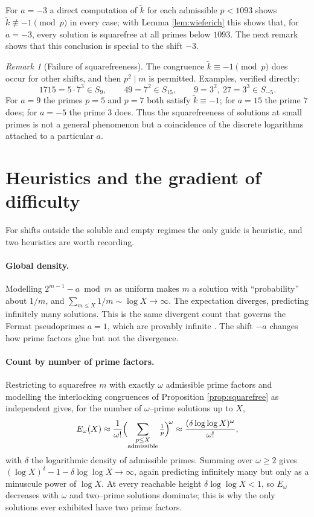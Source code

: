 \documentclass[11pt,reqno]{amsart}
\theoremstyle{plain}
\theoremstyle{definition}
\theoremstyle{remark}
\newtheorem{remark}{Remark}
\newcommand{\dvd}{\mid}
\begin{document}
For $a=-3$ a direct computation of $\widetilde k$ for each admissible $p<1093$ shows $\widetilde k\not\equiv-1\pmod p$ in every case; with Lemma \ref{lem:wieferich} this shows that, for $a=-3$, every solution is squarefree at all primes below $1093$. The next remark shows that this conclusion is special to the shift $-3$.

\begin{remark}[Failure of squarefreeness]\label{rem:sqfree-fail}
The congruence $\widetilde k\equiv-1\pmod p$ does occur for other shifts, and then $p^{2}\dvd m$ is permitted. Examples, verified directly:
\[
1715=5\cdot7^{3}\in S_{9},\qquad 49=7^{2}\in S_{15},\qquad 9=3^{2},\ 27=3^{3}\in S_{-5}.
\]
For $a=9$ the primes $p=5$ and $p=7$ both satisfy $\widetilde k\equiv-1$; for $a=15$ the prime $7$ does; for $a=-5$ the prime $3$ does. Thus the squarefreeness of solutions at small primes is not a general phenomenon but a coincidence of the discrete logarithms attached to a particular $a$.
\end{remark}

\section{Heuristics and the gradient of difficulty}\label{sec:heuristics}

For shifts outside the soluble and empty regimes the only guide is heuristic, and two heuristics are worth recording.

\paragraph{Global density.} Modelling $2^{m-1}-a\bmod m$ as uniform makes $m$ a solution with ``probability'' about $1/m$, and $\sum_{m\le X}1/m\sim\log X\to\infty$. The expectation diverges, predicting infinitely many solutions. This is the same divergent count that governs the Fermat pseudoprimes $a=1$, which are provably infinite \cite{cipolla,pomerance}. The shift $-a$ changes how prime factors glue but not the divergence.

\paragraph{Count by number of prime factors.} Restricting to squarefree $m$ with exactly $\omega$ admissible prime factors and modelling the interlocking congruences of Proposition \ref{prop:squarefree} as independent gives, for the number of $\omega$--prime solutions up to $X$,
\[
E_\omega(X)\approx\frac1{\omega!}\Bigl(\sum_{\substack{p\le X\\ \text{admissible}}}\tfrac1p\Bigr)^{\!\omega}\approx\frac{(\delta\log\log X)^{\omega}}{\omega!},
\]
with $\delta$ the logarithmic density of admissible primes. Summing over $\omega\ge2$ gives $(\log X)^{\delta}-1-\delta\log\log X\to\infty$, again predicting infinitely many but only as a minuscule power of $\log X$. At every reachable height $\delta\log\log X<1$, so $E_\omega$ decreases with $\omega$ and two--prime solutions dominate; this is why the only solutions ever exhibited have two prime factors.
\end{document}
